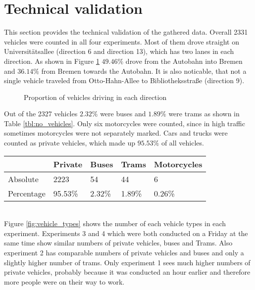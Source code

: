 \section{Technical validation}
\label{sec:Technical_validation}

This section provides the technical validation of the gathered data.
Overall 2331 vehicles were counted in all four experiments. Most of them drove straight on Universitätsallee (direction 6 and direction 13), which has two lanes in each direction. As shown in Figure \ref{fig:direction_pie} $49.46\%$ drove from the Autobahn into Bremen and $36.14\%$ from Bremen towards the Autobahn. It is also noticable, that not a single vehicle traveled from Otto-Hahn-Allee to Bibliotheksstraße (direction 9).
\begin{figure}[htbp]
\begin{center}
\caption{Proportion of vehicles driving in each direction}
\label{fig:direction_pie}
\end{center}
\end{figure}
Out of the 2327 vehicles $2.32\%$ were buses and $1.89\%$ were trams as shown in Table \ref{tbl:no_vehicles}. Only six motorcycles were counted, since in high traffic sometimes motorcycles were not separately marked. Cars and trucks were counted as private vehicles, which made up $95.53\%$ of all vehicles.\\

\begin{tabular}{ |p{4em}|p{3em}|p{3em}|p{3em}|p{5em}|}
 \hline
 & Private & Buses & Trams & Motorcycles\\
 \hline
 Absolute & 2223 & 54 & 44 & 6\\
 \hline
 Percentage & 95.53\% & 2.32\% & 1.89\% & 0.26\% \\
 \hline
\end{tabular}
\label{tbl:no_vehicles}
~\\
Figure \ref{fig:vehicle_types} shows the number of each vehicle types in each experiment. Experiments 3 and 4 which were both conducted on a Friday at the same time show similar numbers of private vehicles, buses and Trams. Also experiment 2 has comparable numbers of private vehicles and buses and only a slightly higher number of trams. Only experiment 1 sees much higher numbers of private vehicles, probably because it was conducted an hour earlier and therefore more people were on their way to work.\\

